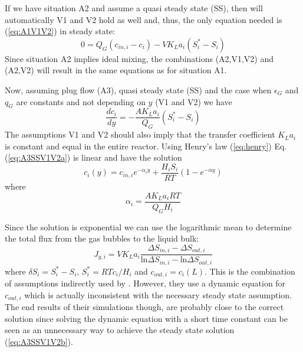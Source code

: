 If we have situation A2 and assume a quasi steady state (SS), then will automatically V1 and V2 hold as well and, thus, the only equation needed is (\ref{eq:A1V1V2}) in steady state:
\begin{equation}\label{eq:A2V1V2}
0=Q_G(c_{in,i}-c_i)-VK_La_i(S_i^\ast-S_i)
\end{equation}
Since situation A2 implies ideal mixing, the combinations (A2,V1,V2) and (A2,V2) will result in the same equations as for situation A1.

Now, assuming plug flow (A3), quasi steady state (SS) and the case when $\epsilon_G$ and $q_G$ are constants and not depending on $y$ (V1 and V2) we have
\begin{equation}\label{eq:A3SSV1V2a}
\frac{dc_i}{dy}=-\frac{AK_La_i}{Q_G}(S_i^\ast- S_i)
\end{equation}
The assumptions V1 and V2 should also imply that the transfer coefficient $K_La_i$ is constant and equal in the entire reactor. Using Henry's law (\ref{eq:henry}) Eq. (\ref{eq:A3SSV1V2a}) is linear and have the solution
\begin{equation}\label{eq:A3SSV1V2b}
c_i(y) =c_{in,i}e^{-\alpha_iy}+\frac{H_iS_i}{RT}(1-e^{-\alpha y})
\end{equation}
where
$$
\alpha_i=\frac{AK_La_iRT}{Q_GH_i}
$$

Since the solution is exponential we can use the logarithmic mean to determine the total flux from the gas bubbles to the liquid bulk:
\begin{equation}\label{eq:A3SSV1V2c}
J_{g,i}=VK_La_i\frac{\Delta S_{in,i}-\Delta S_{out,i}}{\mbox{ln}\Delta S_{in,i}-\mbox{ln}\Delta S_{out,i}}
\end{equation}
where $\delta S_i=S_i^\ast-S_i$, $S_i^\ast=RTc_i/H_i$ and $c_{out,i}=c_i(L)$. This is the combination of assumptions indirectly used by . However, they use a dynamic equation for $c_{out,i}$ which is actually inconsistent with the necessary steady state assumption. The end results of their simulations though, are probably close to the correct solution since solving the dynamic equation with a short time constant can be seen as an unnecessary way to achieve the steady state solution (\ref{eq:A3SSV1V2b}).

